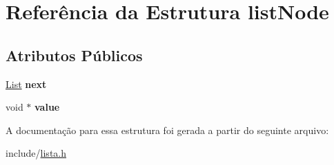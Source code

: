 \hypertarget{structlistNode}{}\section{Referência da Estrutura list\+Node}
\label{structlistNode}
\subsection*{Atributos Públicos}
\begin{DoxyCompactItemize}
\item 
\mbox{\label{structlistNode_ac8957f39101f8155faeb994dd6ae4915}} 
\hyperlink{lista_8h_a698ff83165b8296011a50bb9aba83964}{List} {\bfseries next}
\item 
\mbox{\label{structlistNode_a772dfdd1352f9a568bb567d65cb7b92a}} 
void $\ast$ {\bfseries value}
\end{DoxyCompactItemize}


A documentação para essa estrutura foi gerada a partir do seguinte arquivo\+:\begin{DoxyCompactItemize}
\item 
include/\hyperlink{lista_8h}{lista.\+h}\end{DoxyCompactItemize}
